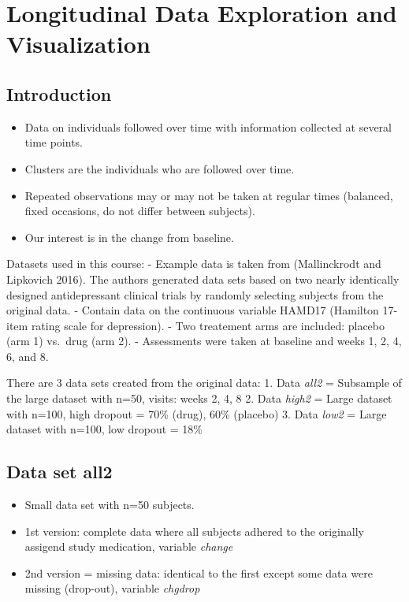 \documentclass[
  letterpaper,
  DIV=11,
  numbers=noendperiod]{scrreprt}
\providecommand{\tightlist}{%
  \setlength{\itemsep}{0pt}\setlength{\parskip}{0pt}}\usepackage{longtable,booktabs,array}
\begin{document}

\hypertarget{longitudinal-data-exploration-and-visualization}{%
\chapter{Longitudinal Data Exploration and
Visualization}\label{longitudinal-data-exploration-and-visualization}}

\hypertarget{introduction-1}{%
\section{Introduction}\label{introduction-1}}

\begin{itemize}
\tightlist
\item
  Data on individuals followed over time with information collected at
  several time points.
\item
  Clusters are the individuals who are followed over time.
\item
  Repeated observations may or may not be taken at regular times
  (balanced, fixed occasions, do not differ between subjects).
\item
  Our interest is in the change from baseline.
\end{itemize}

Datasets used in this course: - Example data is taken from (Mallinckrodt
and Lipkovich 2016). The authors generated data sets based on two nearly
identically designed antidepressant clinical trials by randomly
selecting subjects from the original data. - Contain data on the
continuous variable HAMD17 (Hamilton 17-item rating scale for
depression). - Two treatement arms are included: placebo (arm 1)
vs.~drug (arm 2). - Assessments were taken at baseline and weeks 1, 2,
4, 6, and 8.

There are 3 data sets created from the original data: 1. Data
\emph{all2} = Subsample of the large dataset with n=50, visits: weeks 2,
4, 8 2. Data \emph{high2} = Large dataset with n=100, high dropout =
70\% (drug), 60\% (placebo) 3. Data \emph{low2} = Large dataset with
n=100, low dropout = 18\%

\hypertarget{data-set-all2}{%
\section{Data set all2}\label{data-set-all2}}

\begin{itemize}
\tightlist
\item
  Small data set with n=50 subjects.
\item
  1st version: complete data where all subjects adhered to the
  originally assigend study medication, variable \emph{change}
\item
  2nd version = missing data: identical to the first except some data
  were missing (drop-out), variable \emph{chgdrop}
\end{itemize}
\end{document}
